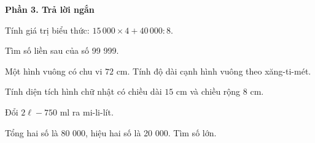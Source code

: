 \textbf{Phần 3. Trả lời ngắn}

\begin{ex} %
Tính giá trị biểu thức: $15\,000 \times 4 + 40\,000 : 8$.
\end{ex}

\begin{ex} %
Tìm số liền sau của số 99 999.
\end{ex}

\begin{ex} %
Một hình vuông có chu vi $72\text{ cm}$. Tính độ dài cạnh hình vuông theo xăng-ti-mét.
\end{ex}

\begin{ex} %
Tính diện tích hình chữ nhật có chiều dài $15\text{ cm}$ và chiều rộng $8\text{ cm}$.
\end{ex}

\begin{ex} %
Đổi $2\ell - 750\text{ ml}$ ra mi-li-lít.
\end{ex}

\begin{ex} %
Tổng hai số là 80 000, hiệu hai số là 20 000. Tìm số lớn.
\end{ex}
